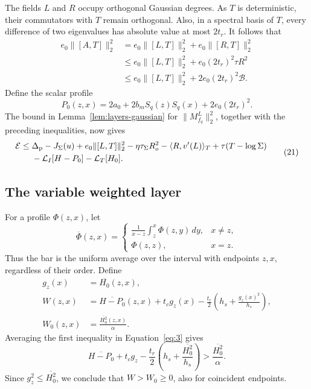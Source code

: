 The fields \(L\) and \(R\) occupy orthogonal Gaussian degrees.
As \(T\) is deterministic, their commutators with \(T\) remain
orthogonal.  Also, in a spectral basis of \(T\), every difference
of two eigenvalues has absolute value at most \(2t_r\).
It follows that
\[
 \begin{aligned}
 e_0\|[A,T]\|_2^2
 &=e_0\|[L,T]\|_2^2+e_0\|[R,T]\|_2^2\\
 &\le e_0\|[L,T]\|_2^2+e_0(2t_r)^2\tau R^2\\
 &\le e_0\|[L,T]\|_2^2+2e_0(2t_r)^2\mathcal B.
 \end{aligned}
\]
Define the scalar profile
\[
 P_0(z,x)=2a_0+2b_mS_q(z)S_q(x)+2e_0(2t_r)^2.
\]
The bound in Lemma~\ref{lem:layers-gaussian} for
\(\|M_{f_q}^L\|_2^2\), together with the preceding inequalities,
now gives
\begin{equation}
 \begin{aligned}
 \mathcal E\le{}&
 \Delta_{\rm p}-J_\Sigma(u)+e_0\|[L,T]\|_2^2
 -\eta\tau_\Sigma R_o^2-\langle R,v'(L)\rangle_T
 +\tau(T-\log\Sigma)\\
 &-\mathcal L_I[H-P_0]-\mathcal L_T[H_0].
 \end{aligned}
 \tag{21}\label{eq:21}
\end{equation}

\subsection{The variable weighted layer}

For a profile \(\Phi(z,x)\), let
\[
 \overline{\Phi}(z,x)=
 \begin{cases}
  \displaystyle\frac1{x-z}\int_z^x\Phi(z,y)\,dy,&x\ne z,\\[2mm]
  \Phi(z,z),&x=z.
 \end{cases}
\]
Thus the bar is the uniform average over the interval with
endpoints \(z,x\), regardless of their order.
Define
\[
 \begin{aligned}
 g_z(x)&=\overline{H_0}(z,x),\\
 W(z,x)&=\overline{H-P_0}(z,x)+t_cg_z(x)
       -\frac{t_r}{2}\left(h_s+\frac{g_z(x)^2}{h_s}\right),\\
 W_0(z,x)&=\frac{\overline{H_0^2}(z,x)}{\alpha}.
 \end{aligned}
\]
Averaging the first inequality in Equation~\eqref{eq:3} gives
\[
 \overline{H-P_0}+t_cg_z
 -\frac{t_r}{2}\left(h_s+\frac{\overline{H_0^2}}{h_s}\right)
 >\frac{\overline{H_0^2}}{\alpha}.
\]
Since \(g_z^2\le\overline{H_0^2}\), we conclude that
\(W>W_0\ge0\), also for coincident endpoints.

